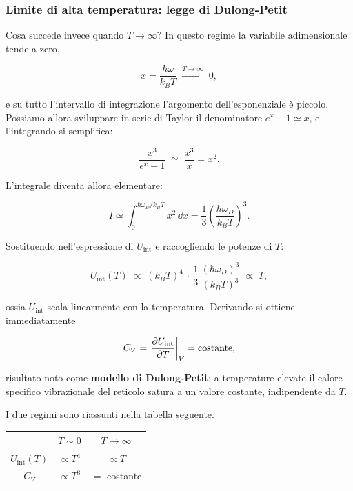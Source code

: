 \subsubsection{Limite di alta temperatura: legge di Dulong-Petit}

Cosa succede invece quando \( T \to \infty \)? In questo regime la variabile adimensionale tende a zero,

\begin{equation}
    x = \frac{\hbar \omega}{k_B T} \;\xrightarrow{T \to \infty}\; 0,
\end{equation}

e su tutto l'intervallo di integrazione l'argomento dell'esponenziale è piccolo. Possiamo allora sviluppare in serie di Taylor il denominatore \( e^{x} - 1 \simeq x \), e l'integrando si semplifica:

\begin{equation}
    \frac{x^{3}}{e^{x} - 1} \;\simeq\; \frac{x^{3}}{x} = x^{2}.
\end{equation}

L'integrale diventa allora elementare:

\begin{equation}
    I \simeq \int_{0}^{\hbar \omega_D / k_B T} x^{2} \, \dd x = \frac{1}{3} \left( \frac{\hbar \omega_D}{k_B T} \right)^{3}.
\end{equation}

Sostituendo nell'espressione di \( U_{\text{int}} \) e raccogliendo le potenze di \( T \):

\begin{equation}
    U_{\text{int}}(T) \;\propto\; (k_B T)^{4} \, \cdot \, \frac{1}{3} \, \frac{(\hbar \omega_D)^{3}}{(k_B T)^{3}} \;\propto\; T,
\end{equation}

ossia \( U_{\text{int}} \) scala linearmente con la temperatura. Derivando si ottiene immediatamente

\begin{equation}
    C_V = \left. \pdv{U_{\text{int}}}{T} \right|_V = \text{costante},
\end{equation}

risultato noto come \textbf{modello di Dulong-Petit}: a temperature elevate il calore specifico vibrazionale del reticolo satura a un valore costante, indipendente da \( T \).

I due regimi sono riassunti nella tabella seguente.

\begin{center}
\begin{tabular}{c|cc}
 & \( T \sim 0 \) & \( T \to \infty \) \\
\hline
\( U_{\text{int}}(T) \) & \( \propto T^{4} \) & \( \propto T \) \\
\( C_V \) & \( \propto T^{3} \) & \( = \) costante \\
\end{tabular}
\end{center}

